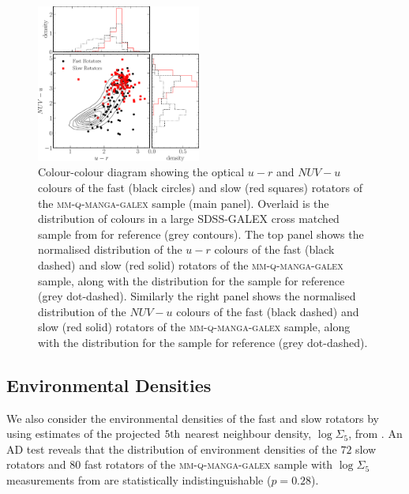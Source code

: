 \documentclass[useAMS,usenatbib]{mn2e}
\begin{document}
\begin{figure}
\centering
\includegraphics[width=0.48\textwidth]{../figures/colour_colour_FR_SR_VOR10_nonkdc.pdf}
\caption{Colour-colour diagram showing the optical $u-r$ and $NUV-u$ colours of the fast (black circles) and slow (red squares) rotators of the \textsc{mm-q-manga-galex} sample (main panel). Overlaid is the distribution of colours in a large SDSS-GALEX cross matched sample from \protect\cite{smethurst15} for reference (grey contours). The top panel shows the normalised distribution of the $u-r$ colours of the fast (black dashed) and slow (red solid) rotators of the \textsc{mm-q-manga-galex} sample, along with the distribution for the \protect\cite{smethurst15} sample for reference (grey dot-dashed). Similarly the right panel shows the normalised distribution of the $NUV-u$ colours of the fast (black dashed) and slow (red solid) rotators of the \textsc{mm-q-manga-galex} sample, along with the distribution for the \protect\cite{smethurst15} sample for reference (grey dot-dashed).}
\label{fig:colcol}
\end{figure} 

\subsection{Environmental Densities}\label{sec:env}

We also consider the environmental densities of the fast and slow rotators by using estimates of the projected $5\rm{th}$ nearest neighbour density,  $\log\Sigma_5$, from \cite{bamford09}. An AD test reveals that the distribution of environment densities of the $72$ slow rotators and $80$ fast rotators of the \textsc{mm-q-manga-galex} sample with $\log\Sigma_5$ measurements from \cite{bamford09} are statistically indistinguishable ($p=0.28$). 
\end{document}
